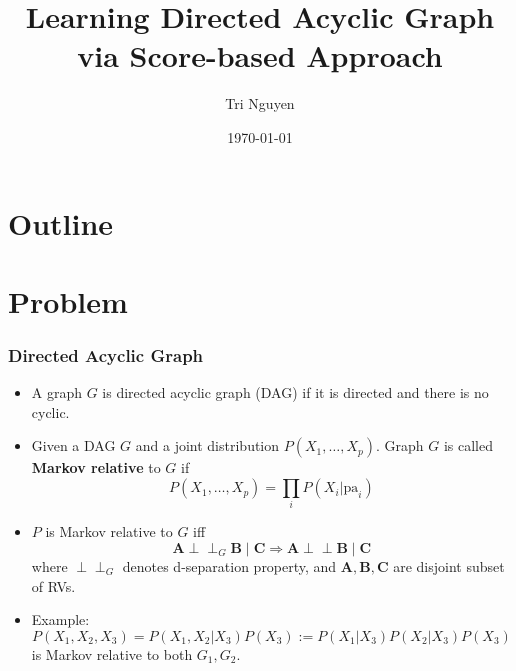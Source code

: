 \documentclass[10pt]{beamer}
\title[Causal Discovery]{Learning Directed Acyclic Graph via Score-based Approach}
\author{Tri Nguyen }
\institute[OSU] 
{
Oregon State University \\ 
}
\date{\today} %
\newcommand{\indep}{\perp \!\!\! \perp}
\begin{document}
\begin{frame}
\titlepage 
\end{frame}

\section*{Outline}%
\label{sec:outline}
\begin{frame}
    \tableofcontents
\end{frame}

\section{Problem}%

\begin{frame}
\frametitle{Directed Acyclic Graph}
\begin{itemize}
    \item A graph $G$ is directed acyclic graph (DAG) if it is directed and there is no cyclic. 
    \item Given a DAG $G$ and a joint distribution  $P(X_1, \ldots , X_p)$. Graph $G$ is called \textbf{Markov relative} to  $G$ if 
                \[
        P(X_1, \ldots , X_p) = \prod_{i} P(X_i | \text{pa}_i)
                \] 
    \item $P$ is Markov relative to  $G$ iff
        \[
        \bm{A} \indep_{G} \bm{B} \mid \bm{C} \Rightarrow \bm{A} \indep \bm{B} \mid \bm{C}
        \] 
        where $\indep_{G}$ denotes d-separation property, and $\bm{A}, \bm{B}, \bm{C}$ are disjoint subset of RVs.
    \item Example: 
        \[
        P(X_1, X_2, X_3) = P(X_1, X_2 | X_3)P(X_3) := P(X_1|X_3)P(X_2|X_3) P(X_3)
        \]
        is Markov relative to both $G_1, G_2$.
\begin{figure}
    \centering
    \begin{subfigure}{0.45\textwidth}
    \resizebox{0.8\textwidth}{!} {
}
    \label{fig:markov_equiv_1}
    \end{subfigure}
    \begin{subfigure}{0.45\textwidth}
    \label{fig:markov_equiv_2}
    \end{subfigure}
\end{figure}
\end{itemize}
\end{frame}
\end{document}
